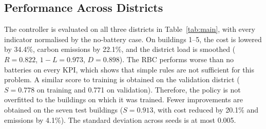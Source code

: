 \documentclass[conference]{IEEEtran}
\begin{document}
\subsection{Performance Across Districts}
The controller is evaluated on all three districts in Table~\ref{tab:main}, with every indicator normalised by the
no-battery case. On buildings 1--5, the cost is lowered by 34.4\%, carbon emissions by 22.1\%, and the district load is
smoothed ($R = 0.822$, $1-L = 0.973$, $D = 0.898$). The RBC performs worse than no batteries on every KPI, which shows that
simple rules are not sufficient for this problem. A similar score to training is obtained on the validation district
($S = 0.778$ on training and 0.771 on validation). Therefore, the policy is not overfitted to the buildings on which it
was trained. Fewer improvements are obtained on the seven test buildings ($S = 0.913$, with cost reduced by 20.1\% and
emissions by 4.1\%). The standard deviation across seeds is at most 0.005.

\begin{table}[!t]
\centering
\caption{The proposed RL-tuned MPC in each district, relative to no battery (lower is better). The values are the mean of five
seeds, with $\pm$ the standard deviation for the scores.}
\label{tab:main}
\setlength{\tabcolsep}{3pt}
\end{table}
\end{document}

